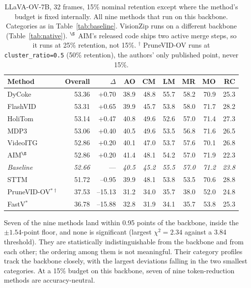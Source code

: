 \documentclass[11pt]{article}
\begin{document}
\begin{table}[H]
  \centering
  \small
  \caption{LLaVA-OV-7B, 32 frames, 15\% nominal retention except where the
  method's budget is fixed internally. All nine methods that run on this
  backbone. Categories as in Table~\ref{tab:baseline}. VisionZip runs on a
  different backbone (Table~\ref{tab:native}). $^{\S}$ AIM's released code
  ships two active merge steps, so it runs at 25\% retention, not 15\%.
  $^{\dagger}$ PruneVID-OV runs at \texttt{cluster\_ratio=0.5} (50\%
  retention), the authors' only published point, never 15\%.}
  \label{tab:llava}
  \begin{tabular}{lrrrrrrrr}
    \toprule
    Method & Overall & $\Delta$ & AO & CM & LM & MR & MO & RC \\
    \midrule
    DyCoke & 53.36 & +0.70 & 38.9 & 48.8 & 55.7 & 58.2 & 70.9 & 25.3 \\
    FlashVID & 53.31 & +0.65 & 39.9 & 45.7 & 53.8 & 58.0 & 71.7 & 28.2 \\
    HoliTom & 53.14 & +0.47 & 40.8 & 49.6 & 52.6 & 57.0 & 71.4 & 27.3 \\
    MDP3 & 53.06 & +0.40 & 40.5 & 49.6 & 53.5 & 56.8 & 71.6 & 26.5 \\
    VideoITG & 52.86 & +0.20 & 40.1 & 47.0 & 53.7 & 57.6 & 70.1 & 26.8 \\
    AIM$^{\S}$ & 52.86 & +0.20 & 41.4 & 48.1 & 54.2 & 57.0 & 71.9 & 22.3 \\
    \textit{Baseline} & \textit{52.66} & --- & \textit{40.5} & \textit{45.2} & \textit{55.5} & \textit{57.0} & \textit{71.2} & \textit{23.8} \\
    STTM & 51.72 & --0.95 & 39.9 & 48.1 & 53.8 & 53.5 & 70.6 & 28.8 \\
    PruneVID-OV$^{*\dagger}$ & 37.53 & --15.13 & 31.2 & 34.0 & 35.7 & 38.0 & 52.0 & 24.8 \\
    FastV$^{*}$ & 36.78 & --15.88 & 32.8 & 31.9 & 34.1 & 35.7 & 53.8 & 25.3 \\
    \bottomrule
  \end{tabular}
\end{table}

Seven of the nine methods land within 0.95 points of the backbone, inside
the $\pm1.54$-point floor, and none is significant (largest $\chi^2 = 2.34$
against a 3.84 threshold). They are statistically indistinguishable from the
backbone and from each other; the ordering among them is not meaningful.
Their category profiles track the backbone closely, with the largest
deviations falling in the two smallest categories. At a 15\% budget on this
backbone, seven of nine token-reduction methods are accuracy-neutral.
\end{document}
